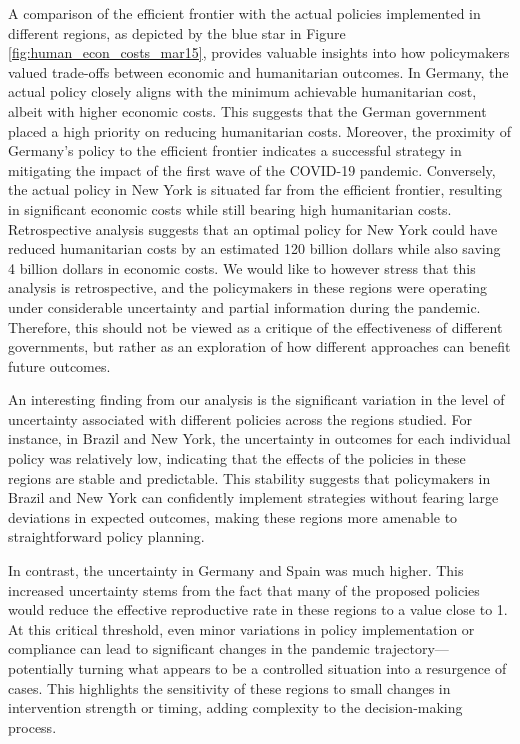 \documentclass[msom,blindrev]{informs3} %
\begin{document}
A comparison of the efficient frontier with the actual policies implemented in different regions, as depicted by the blue star in Figure \ref{fig:human_econ_costs_mar15}, provides valuable insights into how policymakers valued trade-offs between economic and humanitarian outcomes. In Germany, the actual policy closely aligns with the minimum achievable humanitarian cost, albeit with higher economic costs. This suggests that the German government placed a high priority on reducing humanitarian costs. Moreover, the proximity of Germany’s policy to the efficient frontier indicates a successful strategy in mitigating the impact of the first wave of the COVID-19 pandemic. Conversely, the actual policy in New York is situated far from the efficient frontier, resulting in significant economic costs while still bearing high humanitarian costs. Retrospective analysis suggests that an optimal policy for New York could have reduced humanitarian costs by an estimated 120 billion dollars while also saving 4 billion dollars in economic costs. We would like to however stress that this analysis is retrospective, and the policymakers in these regions were operating under considerable uncertainty and partial information during the pandemic. Therefore, this should not be viewed as a critique of the effectiveness of different governments, but rather as an exploration of how different approaches can benefit future outcomes.

An interesting finding from our analysis is the significant variation in the level of uncertainty associated with different policies across the regions studied. For instance, in Brazil and New York, the uncertainty in outcomes for each individual policy was relatively low, indicating that the effects of the policies in these regions are stable and predictable. This stability suggests that policymakers in Brazil and New York can confidently implement strategies without fearing large deviations in expected outcomes, making these regions more amenable to straightforward policy planning.

In contrast, the uncertainty in Germany and Spain was much higher. This increased uncertainty stems from the fact that many of the proposed policies would reduce the effective reproductive rate in these regions to a value close to 1. At this critical threshold, even minor variations in policy implementation or compliance can lead to significant changes in the pandemic trajectory—potentially turning what appears to be a controlled situation into a resurgence of cases. This highlights the sensitivity of these regions to small changes in intervention strength or timing, adding complexity to the decision-making process.
\end{document}
